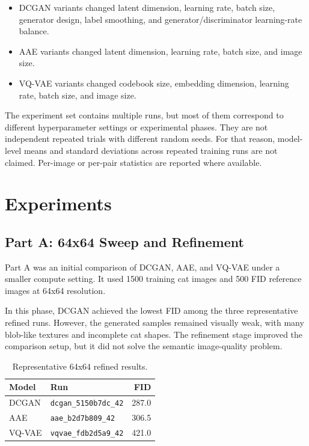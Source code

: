 \documentclass[11pt,a4paper]{article}
\begin{document}
\begin{itemize}[leftmargin=*]
    \item DCGAN variants changed latent dimension, learning rate, batch size, generator design, label smoothing, and generator/discriminator learning-rate balance.
    \item AAE variants changed latent dimension, learning rate, batch size, and image size.
    \item VQ-VAE variants changed codebook size, embedding dimension, learning rate, batch size, and image size.
\end{itemize}

The experiment set contains multiple runs, but most of them correspond to different hyperparameter settings or experimental phases. They are not independent repeated trials with different random seeds. For that reason, model-level means and standard deviations across repeated training runs are not claimed. Per-image or per-pair statistics are reported where available.

\section{Experiments}

\subsection{Part A: 64x64 Sweep and Refinement}

Part A was an initial comparison of DCGAN, AAE, and VQ-VAE under a smaller compute setting. It used 1500 training cat images and 500 FID reference images at 64x64 resolution.

In this phase, DCGAN achieved the lowest FID among the three representative refined runs. However, the generated samples remained visually weak, with many blob-like textures and incomplete cat shapes. The refinement stage improved the comparison setup, but it did not solve the semantic image-quality problem.

\begin{table}[H]
\centering
\caption{Representative 64x64 refined results.}
\begin{tabular}{@{}llr@{}}
\toprule
Model & Run & FID \\
\midrule
DCGAN & \texttt{dcgan\_5150b7dc\_42} & 287.0 \\
AAE & \texttt{aae\_b2d7b809\_42} & 306.5 \\
VQ-VAE & \texttt{vqvae\_fdb2d5a9\_42} & 421.0 \\
\bottomrule
\end{tabular}
\end{table}
\end{document}
